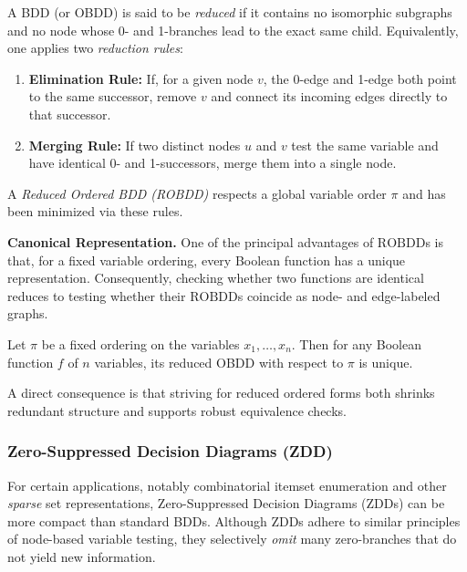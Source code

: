 \begin{definition}
\label{def:reducedobdd}
A BDD (or OBDD) is said to be \emph{reduced} if it contains no isomorphic subgraphs and no node whose 0- and 1-branches lead to the exact same child. Equivalently, one applies two \textit{reduction rules}:
\begin{enumerate}
\item \textbf{Elimination Rule:} If, for a given node $v$, the 0-edge and 1-edge both point to the same successor, remove $v$ and connect its incoming edges directly to that successor.
\item \textbf{Merging Rule:} If two distinct nodes $u$ and $v$ test the same variable and have identical 0- and 1-successors, merge them into a single node.
\end{enumerate}
A \emph{Reduced Ordered BDD (ROBDD)} respects a global variable order $\pi$ and has been minimized via these rules.
\end{definition}

\textbf{Canonical Representation.} One of the principal advantages of $\mathrm{ROBDD}$s is that, for a fixed variable ordering, every Boolean function has a unique representation. Consequently, checking whether two functions are identical reduces to testing whether their $\mathrm{ROBDD}$s coincide as node- and edge-labeled graphs.

\begin{theorem}
\label{thm:canonical}
Let $\pi$ be a fixed ordering on the variables ${x_1,\dots,x_n}$. Then for any Boolean function $f$ of $n$ variables, its reduced OBDD with respect to $\pi$ is unique.
\end{theorem}

A direct consequence is that striving for reduced ordered forms both shrinks redundant structure and supports robust equivalence checks.

\subsubsection{Zero-Suppressed Decision Diagrams (ZDD)}
\label{sec:zdd}

For certain applications, notably combinatorial itemset enumeration and other \emph{sparse} set representations, Zero-Suppressed Decision Diagrams (ZDDs) can be more compact than standard BDDs. Although ZDDs adhere to similar principles of node-based variable testing, they selectively \emph{omit} many zero-branches that do not yield new information.

